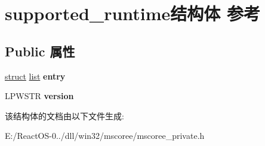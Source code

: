 \hypertarget{structsupported__runtime}{}\section{supported\+\_\+runtime结构体 参考}
\label{structsupported__runtime}
\subsection*{Public 属性}
\begin{DoxyCompactItemize}
\item 
\mbox{\label{structsupported__runtime_a24f705c3cca1d2de871f2f55b658e18e}} 
\hyperlink{interfacestruct}{struct} \hyperlink{classlist}{list} {\bfseries entry}
\item 
\mbox{\label{structsupported__runtime_a758dc5a82e756c1943ec22157635e470}} 
L\+P\+W\+S\+TR {\bfseries version}
\end{DoxyCompactItemize}


该结构体的文档由以下文件生成\+:\begin{DoxyCompactItemize}
\item 
E\+:/\+React\+O\+S-\/0../dll/win32/mscoree/mscoree\+\_\+private.\+h\end{DoxyCompactItemize}
